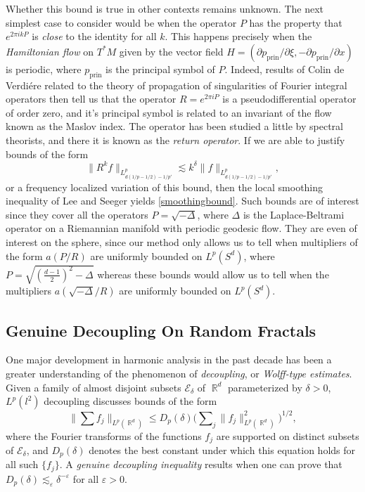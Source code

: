 \documentclass[11pt]{article}
\DeclareMathOperator{\RR}{\mathbb{R}}
\begin{document}
Whether this bound is true in other contexts remains unknown. The next simplest case to consider would be when the operator $P$ has the property that $e^{2 \pi i k P}$ is \emph{close} to the identity for all $k$. This happens precisely when the \emph{Hamiltonian flow} on $T^* M$ given by the vector field $H = ( \partial p_{\text{prin}} / \partial \xi , - \partial p_{\text{prin}} / \partial x)$ is periodic, where $p_{\text{prin}}$ is the principal symbol of $P$. Indeed, results of Colin de Verdi\'{e}re \cite{ColinDeVerdiere} related to the theory of propagation of singularities of Fourier integral operators then tell us that the operator $R = e^{2 \pi i P}$ is a pseudodifferential operator of order zero, and it's principal symbol is related to an invariant of the flow known as the Maslov index. The operator has been studied a little by spectral theorists, and there it is known as the \emph{return operator}. If we are able to justify bounds of the form
%
\[ \| R^k f \|_{L^p_{d(1/p - 1/2) - 1/p'}} \lesssim k^\delta \| f \|_{L^p_{d(1/p - 1/2) - 1/p'}}, \]
%
or a frequency localized variation of this bound, then the local smoothing inequality of Lee and Seeger yields \eqref{smoothingbound}. Such bounds are of interest since they cover all the operators $P = \sqrt{-\Delta}$, where $\Delta$ is the Laplace-Beltrami operator on a Riemannian manifold with periodic geodesic flow. They are even of interest on the sphere, since our method only allows us to tell when multipliers of the form $a( P/R )$ are uniformly bounded on $L^p(S^d)$, where $P = \sqrt{ ( {\scriptstyle \frac{d-1}{2}} )^2 - \Delta }$ whereas these bounds would allow us to tell when the multipliers $a( \sqrt{-\Delta} / R )$ are uniformly bounded on $L^p(S^d)$.

\subsection{Genuine Decoupling On Random Fractals}

One major development in harmonic analysis in the past decade has been a greater understanding of the phenomenon of \emph{decoupling}, or \emph{Wolff-type estimates}. Given a family of almost disjoint subsets $\mathcal{E}_\delta$ of $\RR^d$ parameterized by $\delta > 0$, $L^p(l^2)$ decoupling discusses bounds of the form
%
\[ \Big\| \sum f_j \Big\|_{L^p(\RR^d)} \leq D_p(\delta) \Big( \sum\nolimits_j \| f_j \|_{L^p(\RR^d)}^2 \Big)^{1/2}, \]
%
where the Fourier transforms of the functions $f_j$ are supported on distinct subsets of $\mathcal{E}_\delta$, and $D_p(\delta)$ denotes the best constant under which this equation holds for all such $\{ f_j \}$. A \emph{genuine decoupling inequality} results when one can prove that $D_p(\delta) \lesssim_\varepsilon \delta^{-\varepsilon}$ for all $\varepsilon > 0$.%
\end{document}
